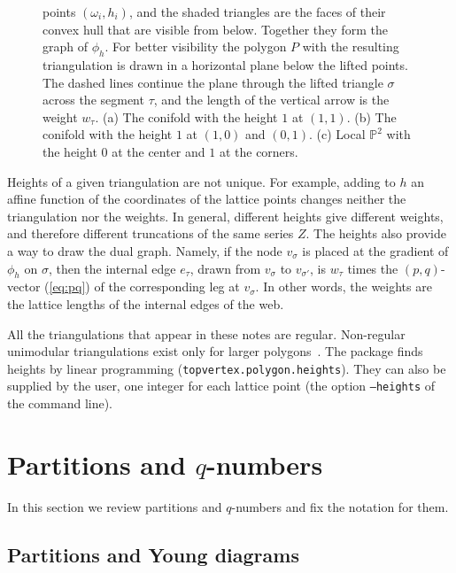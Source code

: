 \documentclass[11pt]{article}
\theoremstyle{plain}
\theoremstyle{definition}
\theoremstyle{remark}
\newcommand{\PP}{\mathbb{P}}
\begin{document}
\begin{figure}[ht]
{points $(\omega_i,h_i)$, and the shaded triangles are the faces of their convex hull that are
visible from below. Together they form the graph of $\phi_h$. For better visibility the polygon
$P$ with the resulting triangulation is drawn in a horizontal plane below the lifted points. The
dashed lines continue the plane through the lifted triangle $\sigma$ across the segment $\tau$,
and the length of the vertical arrow is the weight $w_\tau$. (a) The conifold with the height $1$
at $(1,1)$. (b) The conifold with the height $1$ at $(1,0)$ and $(0,1)$. (c) Local $\PP^2$ with
the height $0$ at the center and $1$ at the corners.}
\label{fig:heights}
\end{figure}

Heights of a given triangulation are not unique. For example, adding to $h$ an affine function
of the coordinates of the lattice points changes neither the triangulation nor the weights. In
general, different heights give different weights, and therefore different truncations of the
same series $Z$. The heights also provide a way to draw the dual graph. Namely, if the node
$v_\sigma$ is placed at the gradient of $\phi_h$ on $\sigma$, then the internal edge $e_\tau$, drawn
from $v_\sigma$ to $v_{\sigma'}$, is $w_\tau$ times the $(p,q)$-vector (\ref{eq:pq}) of the
corresponding leg at $v_\sigma$. In other words, the weights are the lattice lengths of the
internal edges of the web.

All the triangulations that appear in these notes are regular. Non-regular unimodular
triangulations exist only for larger polygons~\cite{DLRS}. The package finds heights by linear
programming (\texttt{topvertex.polygon.heights}). They can also be supplied by the user, one
integer for each lattice point (the option \texttt{--heights} of the command line).

\section{Partitions and \texorpdfstring{$q$}{q}-numbers}\label{sec:partitions}

In this section we review partitions and $q$-numbers and fix the notation for them.


\subsection{Partitions and Young diagrams}
\end{document}
